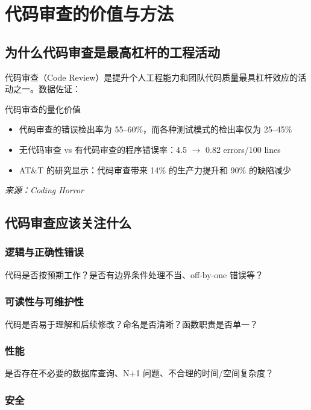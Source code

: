 \section{代码审查的价值与方法}

\subsection{为什么代码审查是最高杠杆的工程活动}

代码审查（Code Review）是提升个人工程能力和团队代码质量最具杠杆效应的活动之一。数据佐证：

\begin{importantbox}{代码审查的量化价值}
\begin{itemize}
    \item 代码审查的错误检出率为 55--60\%，而各种测试模式的检出率仅为 25--45\%
    \item 无代码审查 vs 有代码审查的程序错误率：4.5 $\rightarrow$ 0.82 errors/100 lines
    \item AT\&T 的研究显示：代码审查带来 14\% 的生产力提升和 90\% 的缺陷减少
\end{itemize}
\textit{来源：Coding Horror}
\end{importantbox}

\subsection{代码审查应该关注什么}

\subsubsection{逻辑与正确性错误}

代码是否按预期工作？是否有边界条件处理不当、off-by-one 错误等？

\subsubsection{可读性与可维护性}

代码是否易于理解和后续修改？命名是否清晰？函数职责是否单一？

\subsubsection{性能}

是否存在不必要的数据库查询、N+1 问题、不合理的时间/空间复杂度？

\subsubsection{安全}

